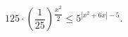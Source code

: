 \begin{ex}[type=inequality]
	\begin{condition}
		$ 125\cdot\left(\dfrac{1}{25}\right)$\tiny$^{\dfrac{x^2}{2}}$\normalsize$\leqslant 5^{|x^2 + 6x| - 5} .$
	\end{condition}
\end{ex}